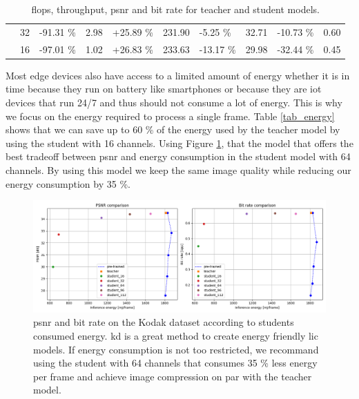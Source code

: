 \begin{table}[]
\begin{tabular}{|c|c|lr|lr|lr|lr|}
                             & 32                                                           & {\color[HTML]{656565} -91.31 \%}                       & 2.98                                              & {\color[HTML]{656565} +25.89 \%}            & 231.90 & {\color[HTML]{656565} -5.25 \%}  & 32.71 & {\color[HTML]{656565} -10.73 \%} & 0.60 \\ \cline{2-10}
                             & 16                                                           & {\color[HTML]{656565} -97.01 \%}                       & 1.02                                              & {\color[HTML]{656565} +26.83 \%}            & 233.63 & {\color[HTML]{656565} -13.17 \%} & 29.98 & {\color[HTML]{656565} -32.44 \%} & 0.45 \\ \hline
    \end{tabular}
    \caption[\acrshort{flop}s, throughput, \acrshort{psnr} and bit rate for teacher and student models.]{\acrshort{flop}s, throughput, \acrshort{psnr} and bit rate for teacher and student models.}
    \label{tab_compute}
\end{table}

Most edge devices also have access to a limited amount of energy whether it is in time because they run on battery like smartphones or because they are \acrfull{iot} devices that run 24/7 and thus should not consume a lot of energy. This is why we focus on the energy required to process a single frame. Table \ref{tab_energy} shows that we can save up to 60 \% of the energy used by the teacher model by using the student with 16 channels. Using Figure \ref{kd_lic_energy}, that the model that offers the best tradeoff between \acrshort{psnr} and energy consumption in the student model with 64 channels. By using this model we keep the same image quality while reducing our energy consumption by 35 \%.

\begin{figure}
    \centering
    \includegraphics[width=15cm]{img/kd_lic_energy.png}
    \caption[\acrshort{psnr} and bit rate on the Kodak dataset according to students consumed energy.]{\acrshort{psnr} and bit rate on the Kodak dataset according to students consumed energy. \acrshort{kd} is a great method to create energy friendly \acrshort{lic} models. If energy consumption is not too restricted, we recommand using the student with 64 channels that consumes 35 \% less energy per frame and achieve image compression on par with the teacher model.}
    \label{kd_lic_energy}
\end{figure}

